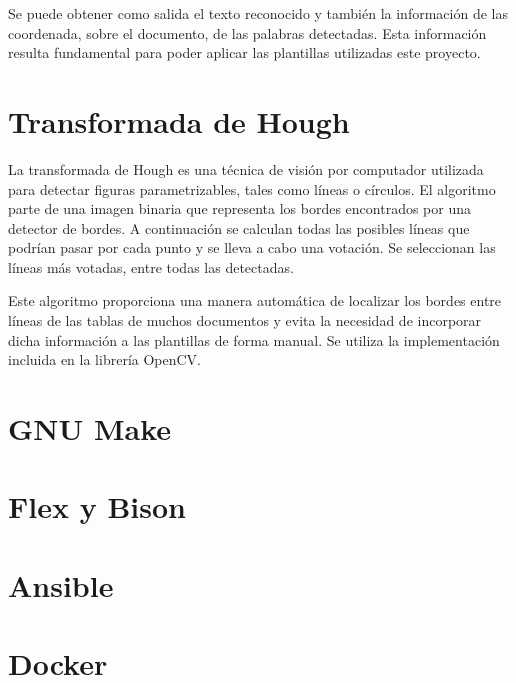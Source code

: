 Se puede obtener como salida el texto reconocido y también la información de las coordenada, sobre el documento, de las palabras detectadas. Esta información resulta fundamental para poder aplicar las plantillas utilizadas este proyecto. 

\section{Transformada de Hough}

La transformada de Hough es una técnica de visión por computador utilizada para detectar figuras parametrizables, tales como líneas o círculos. El algoritmo parte de una imagen binaria que representa los bordes encontrados por una detector de bordes. A continuación se calculan todas las posibles líneas que podrían pasar por cada punto y se lleva a cabo una votación. Se seleccionan las líneas más votadas, entre todas las detectadas.

Este algoritmo proporciona una manera automática de localizar los bordes entre líneas de las tablas de muchos documentos y evita la necesidad de incorporar dicha información a las plantillas de forma manual. Se utiliza la implementación incluida en la librería OpenCV.

\section{GNU Make}
\section{Flex y Bison}
\section{Ansible}
\section{Docker}


